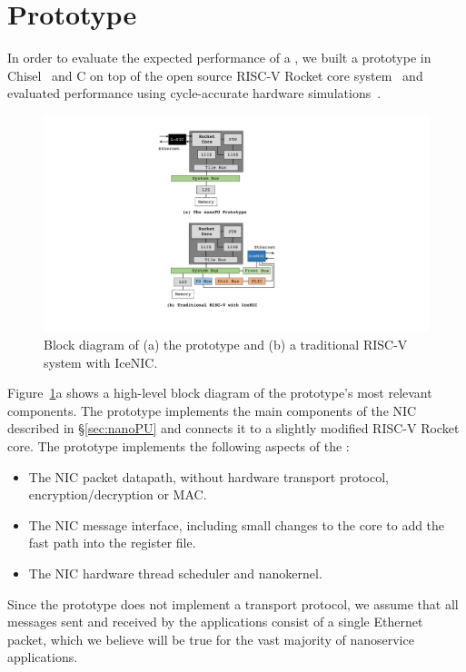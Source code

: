 \section{\name{} Prototype}
\label{sec:prototype}
In order to evaluate the expected performance of a \name{}, we built a prototype in Chisel~\cite{chisel} and C on top of the open source RISC-V Rocket core system~\cite{rocket-chip} and evaluated performance using cycle-accurate hardware simulations~\cite{verilator}.

\begin{figure}
  \includegraphics[width=0.9\linewidth]{./figures/prototype}
  \caption{Block diagram of (a) the \name{} prototype and (b) a traditional RISC-V system with IceNIC.}
  \label{fig:prototype}
\end{figure}

Figure~\ref{fig:prototype}a shows a high-level block diagram of the prototype's most relevant components.
The prototype implements the main components of the NIC described in \S\ref{sec:nanoPU} and connects it to a slightly modified RISC-V Rocket core.
The prototype implements the following aspects of the \name{}:
\begin{itemize}[topsep=0.4\baselineskip, leftmargin=20pt]
    \item The NIC packet datapath, without hardware transport protocol, encryption/decryption or MAC.
    \item The NIC message interface, including small changes to the core to add the fast path into the register file.
    \item The NIC hardware thread scheduler and nanokernel.
\end{itemize}
Since the prototype does not implement a transport protocol, we assume that all messages sent and received by the applications consist of a single Ethernet packet, which we believe will be true for the vast majority of nanoservice applications.

